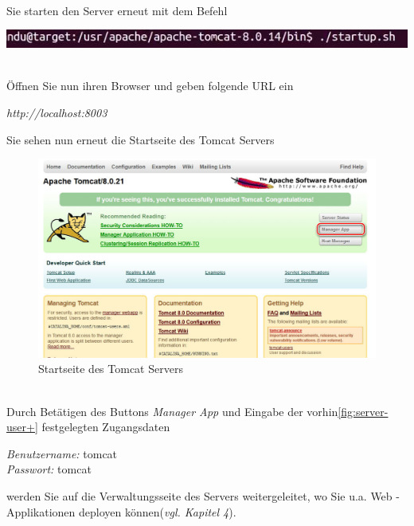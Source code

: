 \documentclass[a4paper, 12pt]{scrreprt}
\begin{document}
\ \\
Sie starten den Server erneut mit dem Befehl
\begin{center}
	\includegraphics[width=0.8\linewidth]{Grafiken/Tomcat_starten_linux}
\end{center}
\ \\
Öffnen Sie nun ihren Browser und geben folgende URL ein
\begin{center}
	{\it http://localhost:8003}
\end{center}
Sie sehen nun erneut die Startseite des Tomcat Servers\begin{figure}
	\centering
	\includegraphics[width=0.8\linewidth]{Grafiken/ServerStartPage}
	\caption{Startseite des Tomcat Servers}
	\label{fig:ServerStartPage12}
\end{figure}
\ \\
Durch Betätigen des Buttons {\it Manager App} und Eingabe der vorhin\ref{fig:server-user+} festgelegten Zugangsdaten
\begin{center}
	{\it Benutzername:} tomcat \\
	{\it Passwort:} tomcat 
\end{center} werden Sie auf die Verwaltungsseite des Servers weitergeleitet, wo Sie u.a. Web - Applikationen deployen können({\it vgl. Kapitel 4}).
\end{document}
